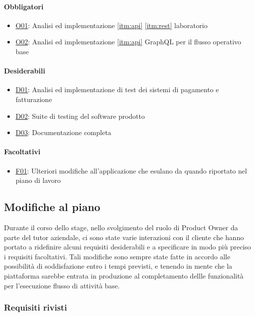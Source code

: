 \paragraph{Obbligatori}
\begin{itemize}
    \item \underline{O01}: Analisi ed implementazione \ref{itm:api} \ref{itm:rest} laboratorio
    \item \underline{O02}: Analisi ed implementazione \ref{itm:api} GraphQL per il flusso operativo base
\end{itemize}
\vspace{-15pt}
\paragraph{Desiderabili}
\begin{itemize}
    \item \underline{D01}: Analisi ed implementazione di test dei sistemi di pagamento e fatturazione
    \item \underline{D02}: Suite di testing del software prodotto
    \item \underline{D03}: Documentazione completa
\end{itemize}
\vspace{-15pt}
\paragraph{Facoltativi}
\begin{itemize}
    \item \underline{F01}: Ulteriori modifiche all’applicazione che esulano da quando riportato nel piano di lavoro
\end{itemize}
\subsection{Modifiche al piano}
Durante il corso dello stage, nello svolgimento del ruolo di Product Owner da parte del tutor aziendale, ci sono state varie interazioni con il cliente che hanno portato a ridefinire alcuni requisiti desiderabili e a specificare in modo più preciso i requisiti facoltativi. Tali modifiche sono sempre state fatte in accordo alle possibilità di soddisfazione entro i tempi previsti, e tenendo in mente che la piattaforma sarebbe entrata in produzione al completamento dellle funzionalità per l'esecuzione flusso di attività base.
\subsubsection{Requisiti rivisti}
